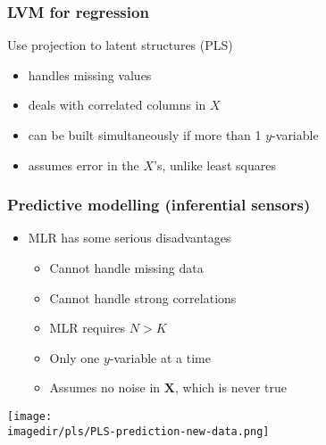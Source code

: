 \begin{frame}\frametitle{LVM for regression}

	Use projection to latent structures (PLS)
	\begin{itemize}
		\item	handles missing values
		\item	deals with correlated columns in $X$
		\item	can be built simultaneously if more than 1 $y$-variable
		\item	assumes error in the $X$'s, unlike least squares
	\end{itemize}
\end{frame}

%
%
%
%

\begin{frame}\frametitle{Predictive modelling (inferential sensors)}
	\begin{itemize}
		\item	MLR has some serious disadvantages
		\begin{itemize}
			\item	Cannot handle missing data
			\item	Cannot handle strong correlations
			\item	MLR requires $N > K$
			\item	Only one $y$-variable at a time
			\item	Assumes no noise in $\mathbf{X}$, which is never true
		\end{itemize}
	\end{itemize}

	\texttt{[image: \\imagedir/pls/PLS-prediction-new-data.png]}
\end{frame}

